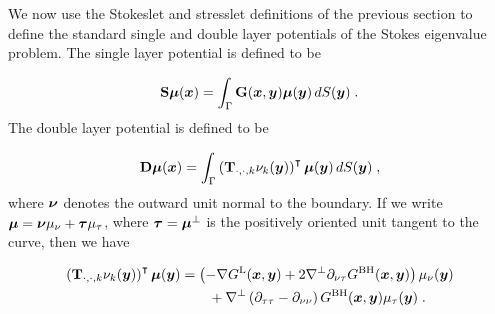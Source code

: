We now use the Stokeslet and stresslet definitions
of the previous section to define the standard single
and double layer potentials of the Stokes eigenvalue
problem. The single layer potential is defined to
be

\begin{equation}
  {\bf S} {\boldsymbol \mu} ({\boldsymbol x}) = \int_\Gamma {\bf G} ({\boldsymbol x},{\boldsymbol y}) {\boldsymbol \mu}({\boldsymbol y})
  \, dS({\boldsymbol y}) \; .
\end{equation}
The double layer potential is defined to be

\begin{equation}
  {\bf D} {\boldsymbol \mu} ({\boldsymbol x}) = \int_\Gamma \left ( {\bf T}_{\cdot,\cdot,k}\nu_k({\boldsymbol y})
  \right )^\intercal {\boldsymbol \mu}({\boldsymbol y}) \, dS({\boldsymbol y}) \; ,
\end{equation}
where ${\boldsymbol \nu}$ denotes the outward unit normal to the boundary.
If we write ${\boldsymbol \mu} = {\boldsymbol \nu} \mu_\nu + {\boldsymbol \tau} \mu_\tau$,
where ${\boldsymbol \tau} = {\boldsymbol \mu}^\bot$ is the positively oriented unit
tangent to the curve, then we have

\begin{align}
  \left ( {\bf T}_{\cdot,\cdot,k}\nu_k({\boldsymbol y}) \right )^\intercal
  {\boldsymbol \mu}({\boldsymbol y}) &= \left ( - \nabla G^{\textrm{L}}({\boldsymbol x},{\boldsymbol y}) + 2 \nabla^\bot
  \partial_{\nu\tau} G^{\textrm{BH}}({\boldsymbol x},{\boldsymbol y}) \right ) \mu_\nu({\boldsymbol y}) \nonumber \\
  & \qquad+
  \nabla^\bot \left (\partial_{\tau\tau}-\partial_{\nu\nu} \right )
  G^{\textrm{BH}}({\boldsymbol x},{\boldsymbol y}) \mu_\tau({\boldsymbol y}) \; .
\end{align}

